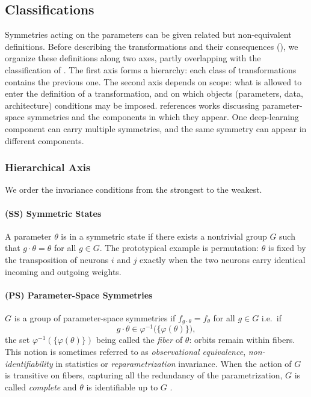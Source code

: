\documentclass[mathematics,review,submit,moreauthors]{Definitions/mdpi}
\begin{document}
\subsection{Classifications}\label{sec:classifications-param-space-symmetries}

Symmetries acting on the parameters can be given related but non-equivalent definitions.
Before describing the transformations and their consequences (), we organize these definitions along two axes, partly overlapping with the classification of \citet{zhao2025}.
The first axis forms a hierarchy: each class of transformations contains the previous one.
The second axis depends on scope: what is allowed to enter the definition of a transformation, and on which objects (parameters, data, architecture) conditions may be imposed.
 references works discussing parameter-space symmetries and the components in which they appear.
One deep-learning component can carry multiple symmetries, and the same symmetry can appear in different components.

\subsubsection{Hierarchical Axis}\label{sec:hierarchy-param-space-symmetries}

We order the invariance conditions from the strongest to the weakest.

\paragraph{(SS) Symmetric States}
A parameter $\theta$ is in a symmetric state \citep{simsek2021,ziyin2025} if there exists a nontrivial group $G$ such that $g\cdot\theta=\theta$ for all $g\in G$.
The prototypical example is permutation: $\theta$ is fixed by the transposition of neurons $i$ and $j$ exactly when the two neurons carry identical incoming and outgoing weights.

\paragraph{(PS) Parameter-Space Symmetries}
$G$ is a group of parameter-space symmetries if $f_{g\cdot\theta}=f_\theta$ for all $g\in G$ i.e.\ if
\begin{equation*}
    g\cdot\theta \in \varphi^{-1}\big(\{\varphi(\theta)\}\big),
\end{equation*}
the set $\varphi^{-1}(\{\varphi(\theta)\})$ being called the \emph{fiber} of $\theta$: orbits remain within fibers.
This notion is sometimes referred to as \emph{observational equivalence}, \emph{non-identifiability} in statistics or \emph{reparametrization} invariance.
When the action of $G$ is transitive on fibers, capturing all the redundancy of the parametrization, $G$ is called \emph{complete} and $\theta$ is identifiable up to $G$ \citep{zhao2025}.
\end{document}
